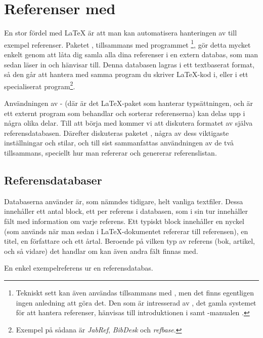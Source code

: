 \documentclass[10pt,../../a4.tex]{subfiles}
\begin{document}
\chapter{Referenser med \texorpdfstring{}{biblatex}}\label{sec:5}
En stor fördel med \LaTeX{} är att man kan automatisera hanteringen av
till exempel referenser. Paketet , tillsammans med
programmet \footnote{Tekniskt sett kan även
\BibTeX{} användas tillsammans med , men det finns egentligen ingen anledning att göra det. Den som är intresserad av
\BibTeX{}, det gamla systemet för att hantera referenser, hänvisas till introduktionen i \textcite{Fenn06} samt \BibTeX{}-manualen
\parencite{Patashnik88a}.}, gör detta mycket enkelt genom att låta dig
samla alla dina referenser i en extern databas, som man sedan läser in
och hänvisar till. Denna databasen lagras i ett textbaserat format, så
den går att hantera med samma program du skriver \LaTeX-kod i, eller i
ett specialiserat program\footnote{Exempel på sådana är \emph{JabRef},
\emph{BibDesk} och \emph{refbase}.}.

Användningen av - (där  är det
\LaTeX-paket som hanterar typsättningen, och  är ett externt
program som behandlar och sorterar referenserna) kan delas upp i några
olika delar. Till att börja med kommer vi att diskutera formatet av
själva referensdatabasen. Därefter diskuteras paketet ,
några av dess viktigaste inställningar och stilar, och till sist
sammanfattas användningen av de två tillsammans, speciellt hur man
refererar och genererar referenslistan.

\section{Referensdatabaser}
Databaserna  använder är, som nämndes tidigare, helt
vanliga textfiler. Dessa innehåller ett antal block, ett per referens
i databasen, som i sin tur innehåller fält med information om varje
referens. Ett typiskt block innehåller en nyckel (som används när man
sedan i \LaTeX-dokumentet refererar till referensen), en titel, en
författare och ett årtal. Beroende på vilken typ av referens (bok,
artikel, och så vidare) det handlar om kan även andra fält finnas med.

\begin{kod}[tbp]
	\centering
	\vfil%
	\vfil%
	\caption{En enkel exempelreferens ur en referensdatabas.}
	\label{ex:bibtex}
\end{kod}
\end{document}
